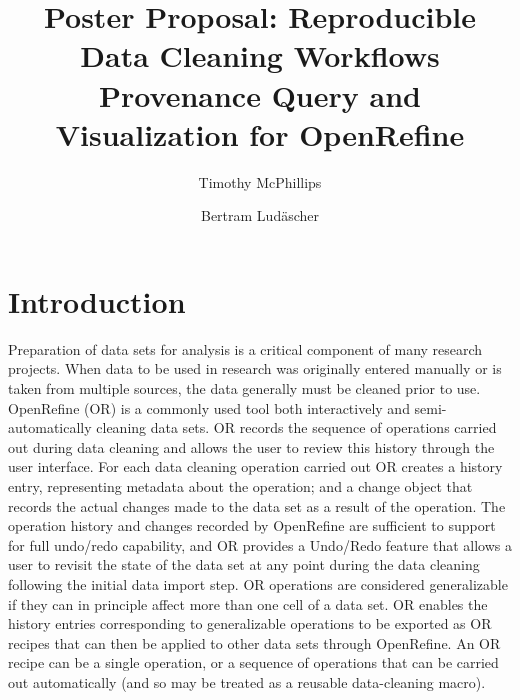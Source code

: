 \documentclass[sigconf,screen,nonacm]{acmart}
\begin{document}
\title[Reproducible Data Cleaning]{Poster Proposal: Reproducible Data Cleaning Workflows Provenance Query and Visualization for OpenRefine}

\author{Timothy McPhillips}
 

\author{Bertram Lud\"ascher}



\maketitle

\section{Introduction}

Preparation of data sets for analysis is a critical component of many research projects.
When data to be used in research was originally entered manually or is taken from multiple sources, the data generally must be cleaned prior to use.
OpenRefine (OR) is a commonly used tool both interactively and semi-automatically cleaning data sets.
OR records the sequence of operations carried out during data cleaning and allows the user to review this history through the user interface.
For each data cleaning operation carried out OR creates a history entry, representing metadata about the operation; and a change object that records the actual changes made to the data set as a result of the operation.
The operation history and changes recorded by OpenRefine are sufficient to support for full undo/redo capability, and OR provides a Undo/Redo feature that allows a user to revisit the state of the data set at any point during the data cleaning following the initial data import step.
OR operations are considered generalizable if they can in principle affect more than one cell of a data set.
OR enables the history entries corresponding to generalizable operations to be exported as  OR recipes that can then be applied to other data sets through OpenRefine.
An OR recipe can be a single operation, or a sequence of operations that can be carried out automatically (and so may be treated as a reusable data-cleaning macro).
\cite{verborgh_using_2013}
\end{document}

